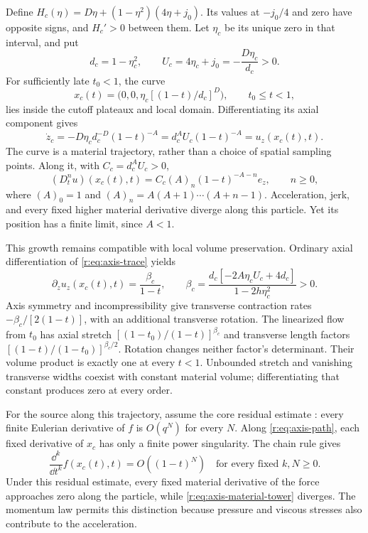 Define \(H_c(\eta)=D\eta+(1-\eta^2)(4\eta+j_0)\).
Its values at \(-j_0/4\) and zero have opposite signs, and
\(H_c'>0\) between them. Let \(\eta_c\) be its unique zero in that
interval, and put
\[
 d_c=1-\eta_c^2,\qquad U_c=4\eta_c+j_0
       =-\frac{D\eta_c}{d_c}>0.
\]
For sufficiently late \(t_0<1\), the curve
\begin{equation}
 x_c(t)=\bigl(0,0,\eta_c[(1-t)/d_c]^D\bigr),
 \qquad t_0\le t<1,
 \label{r:eq:axis-path}
\end{equation}
lies inside the cutoff plateaux and local domain. Differentiating its
axial component gives
\[
 \dot z_c=-D\eta_c d_c^{-D}(1-t)^{-A}
         =d_c^A U_c(1-t)^{-A}
         =u_z(x_c(t),t).
\]
The curve is a material trajectory, rather than a choice of spatial
sampling points. Along it, with \(C_c=d_c^AU_c>0\),
\begin{equation}
 (D_t^n u)(x_c(t),t)
 =C_c(A)_n(1-t)^{-A-n}e_z,\qquad n\ge0,
 \label{r:eq:axis-material-tower}
\end{equation}
where \((A)_0=1\) and
\((A)_n=A(A+1)\cdots(A+n-1)\). Acceleration, jerk, and every
fixed higher material derivative diverge along this particle. Yet its
position has a finite limit, since \(A<1\).

This growth remains compatible with local volume preservation. Ordinary
axial differentiation of \eqref{r:eq:axis-trace} yields
\[
 \partial_z u_z(x_c(t),t)=\frac{\beta_c}{1-t},\qquad
 \beta_c=\frac{d_c[-2A\eta_c U_c+4d_c]}
                   {1-2h\eta_c^2}>0.
\]
Axis symmetry and incompressibility give transverse contraction rates
\(-\beta_c/[2(1-t)]\), with an additional transverse rotation.
The linearized flow from \(t_0\) has axial stretch
\([(1-t_0)/(1-t)]^{\beta_c}\) and transverse length factors
\([(1-t)/(1-t_0)]^{\beta_c/2}\). Rotation changes neither factor's
determinant. Their volume product is exactly one at every \(t<1\).
Unbounded stretch and vanishing transverse widths coexist with constant
material volume; differentiating that constant produces zero at every
order.

For the source along this trajectory, assume the core residual estimate
\cite[(9.20)]{openai-paper}: every finite Eulerian derivative of \(f\)
is \(O(q^N)\) for every \(N\). Along \eqref{r:eq:axis-path}, each fixed
derivative of \(x_c\) has only a finite power singularity. The chain
rule gives
\[
 \frac{\dd^k}{\dd t^k}f(x_c(t),t)=O((1-t)^N)
 \quad\text{for every fixed }k,N\ge0.
\]
Under this residual estimate, every fixed material derivative of the
force approaches zero along the particle, while
\eqref{r:eq:axis-material-tower} diverges. The momentum law permits this
distinction because pressure and viscous stresses also contribute to
the acceleration.

